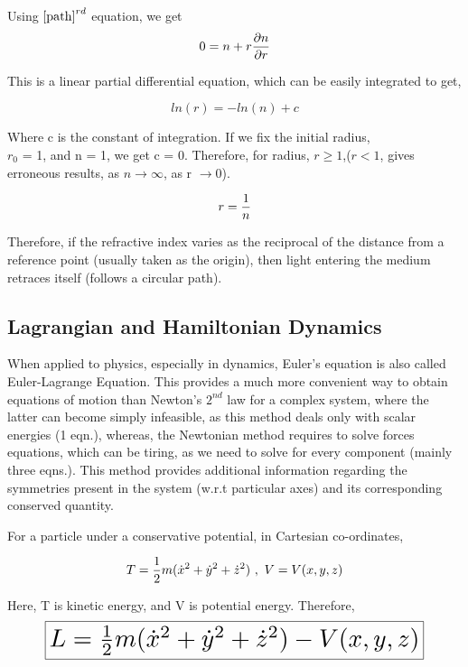 \documentclass[a4paper]{article}
\begin{document}
Using $\ref{path}^{rd}$ equation, we get 
\begin{equation}
    0 = n + r {\partial n \over \partial r}
\end{equation}

This is a linear partial differential equation, which can be easily integrated to get,

\begin{equation}
    ln(r) = -ln(n) + c
\end{equation}

Where c is the constant of integration. If we fix the initial radius, \\$r_0$ = 1, and n = 1, we get c = 0. Therefore, for radius, $r \geq 1$,($r < 1$, gives erroneous results, as $n \rightarrow \infty$, as r $\rightarrow 0$).

\begin{equation}
    r = {1\over n} \label{result}
\end{equation}

Therefore, if the refractive index varies as the reciprocal of the distance from a reference point (usually taken as the origin), then light entering the medium retraces itself (follows a circular path).

\subsection{Lagrangian and Hamiltonian Dynamics}
When applied to physics, especially in dynamics, Euler's equation is also called Euler-Lagrange Equation. This provides a much more convenient way to obtain equations of motion than Newton's $2^{nd}$ law for a complex system, where the latter can become simply infeasible, as this method deals only with scalar energies (1 eqn.), whereas, the Newtonian method requires to solve forces equations, which can be tiring, as we need to solve for every component (mainly three eqns.). This method provides additional information regarding the symmetries present in the system (w.r.t particular axes) and its corresponding conserved quantity.

For a particle under a conservative potential, in Cartesian co-ordinates,

\begin{equation}
    T = {1\over 2}m({\dot x}^2+{\dot y}^2+{\dot z}^2)\ ,\ V = V(x,y,z)
\end{equation}

Here, T is kinetic energy, and V is potential energy. Therefore,\\
\begin{equation}
\fbox{\resizebox{0.85\textwidth}{!}{$L = {1 \over 2}m(\dot{x}^{2}+\dot{y}^{2}+\dot{z}^{2}) - V(x,y,z) $}} \label{cart}
\end{equation}
\newline
\end{document}
